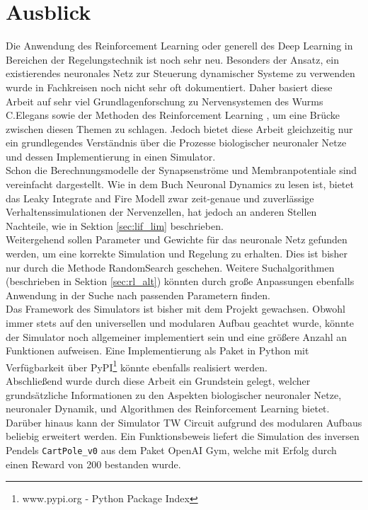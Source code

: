 \section{Ausblick}
\label{sec:erg_ausblick}
	Die Anwendung des Reinforcement Learning oder generell des Deep Learning in Bereichen der Regelungstechnik ist noch sehr neu. Besonders der Ansatz, ein existierendes neuronales Netz zur Steuerung dynamischer Systeme zu verwenden wurde in Fachkreisen noch nicht sehr oft dokumentiert. Daher basiert diese Arbeit auf sehr viel Grundlagenforschung zu Nervensystemen des Wurms C.Elegans \cite{CElegans} sowie der Methoden des Reinforcement Learning \cite{DeepLearning} \cite{Russell2016}, um eine Brücke zwischen diesen Themen zu schlagen. Jedoch bietet diese Arbeit gleichzeitig nur ein grundlegendes Verständnis über die Prozesse biologischer neuronaler Netze und dessen Implementierung in einen Simulator.\\
	Schon die Berechnungsmodelle der Synapsenströme und Membranpotentiale sind vereinfacht dargestellt. Wie in dem Buch Neuronal Dynamics \cite{NeuronalDynamics} zu lesen ist, bietet das Leaky Integrate and Fire Modell zwar zeit-genaue und zuverlässige Verhaltenssimulationen der Nervenzellen, hat jedoch an anderen Stellen Nachteile, wie in Sektion \ref{sec:lif_lim} beschrieben.\\
	Weitergehend sollen Parameter und Gewichte für das neuronale Netz gefunden werden, um eine korrekte Simulation und Regelung zu erhalten. Dies ist bisher nur durch die Methode RandomSearch geschehen. Weitere Suchalgorithmen (beschrieben in Sektion \ref{sec:rl_alt}) könnten durch große Anpassungen ebenfalls Anwendung in der Suche nach passenden Parametern finden.\\
	Das Framework des Simulators ist bisher mit dem Projekt gewachsen. Obwohl immer stets auf den universellen und modularen Aufbau geachtet wurde, könnte der Simulator noch allgemeiner implementiert sein und eine größere Anzahl an Funktionen aufweisen. Eine Implementierung als Paket in Python mit Verfügbarkeit über PyPI\footnote{www.pypi.org - Python Package Index} könnte ebenfalls realisiert werden.\\
	Abschließend wurde durch diese Arbeit ein Grundstein gelegt, welcher grundsätzliche Informationen zu den Aspekten biologischer neuronaler Netze, neuronaler Dynamik, und Algorithmen des Reinforcement Learning bietet. Darüber hinaus kann der Simulator TW Circuit aufgrund des modularen Aufbaus beliebig erweitert werden. Ein Funktionsbeweis liefert die Simulation des inversen Pendels \texttt{CartPole\_v0} aus dem Paket OpenAI Gym, welche mit Erfolg durch einen Reward von 200 bestanden wurde.

